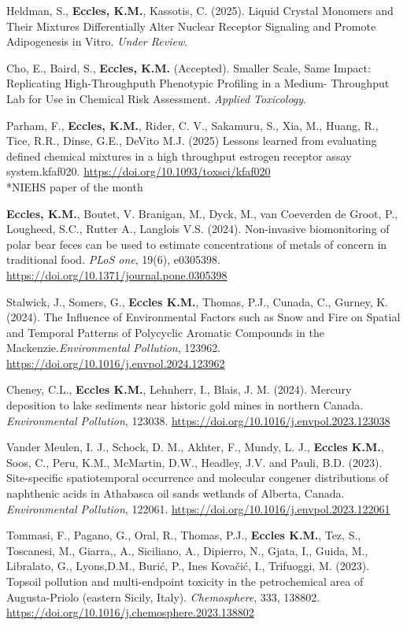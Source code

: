 \documentclass[margin,line]{res}
\begin{document}
\begin{resume}
Heldman, S., \textbf{Eccles, K.M.}, Kassotis, C. (2025). Liquid Crystal Monomers and Their Mixtures Differentially Alter Nuclear Receptor Signaling and Promote Adipogenesis in Vitro. \textit{Under Review}.

Cho, E., Baird, S., \textbf{Eccles, K.M.} (Accepted). Smaller Scale, Same Impact: Replicating High-Throughputh Phenotypic Profiling in a Medium- Throughput Lab for Use in Chemical Risk Assessment. \textit{Applied Toxicology}.

Parham, F., \textbf{Eccles, K.M.}, Rider, C. V., Sakamuru, S., Xia, M., Huang, R., Tice, R.R., Dinse, G.E., DeVito M.J. (2025) Lessons learned from evaluating defined chemical mixtures in a high throughput estrogen receptor assay system.kfaf020. \url{https://doi.org/10.1093/toxsci/kfaf020}\\
\mbox{*}NIEHS paper of the month

\textbf{Eccles, K.M.}, Boutet, V. Branigan, M., Dyck, M., van Coeverden de Groot, P., Lougheed, S.C., Rutter A., Langlois V.S. (2024). Non-invasive biomonitoring of polar bear feces can be used to estimate concentrations of metals of concern in traditional food. \textit{PLoS one}, 19(6), e0305398. \url{https://doi.org/10.1371/journal.pone.0305398}

Stalwick, J., Somers, G., \textbf{Eccles K.M.}, Thomas, P.J., Cunada, C., Gurney, K. (2024). The Influence of Environmental Factors such as Snow and Fire on Spatial and Temporal Patterns of Polycyclic Aromatic Compounds in the Mackenzie.\textit{Environmental Pollution}, 123962. \url{https://doi.org/10.1016/j.envpol.2024.123962}

Cheney, C.L., \textbf{Eccles K.M.}, Lehnherr, I., Blais, J. M. (2024). Mercury deposition to lake sediments near historic gold mines in northern Canada. \textit{Environmental Pollution}, 123038. \url{https://doi.org/10.1016/j.envpol.2023.123038}

Vander Meulen, I. J., Schock, D. M., Akhter, F., Mundy, L. J., \textbf{Eccles K.M.}, Soos, C., Peru, K.M., McMartin, D.W., Headley, J.V. and Pauli, B.D. (2023). Site-specific spatiotemporal occurrence and molecular congener distributions of naphthenic acids in Athabasca oil sands wetlands of Alberta, Canada. \textit{Environmental Pollution}, 122061. \url{https://doi.org/10.1016/j.envpol.2023.122061}

Tommasi, F., Pagano, G., Oral, R., Thomas, P.J., \textbf{Eccles K.M.}, Tez, S., Toscanesi, M., Giarra,, A., Siciliano, A., Dipierro, N., Gjata, I,, Guida, M., Libralato, G., Lyons,D.M., Burić, P., Ines Kovačić, I.,  Trifuoggi, M. (2023). Topsoil pollution and multi-endpoint toxicity in the petrochemical area of Augusta-Priolo (eastern Sicily, Italy). \textit{Chemosphere}, 333, 138802. \url{https://doi.org/10.1016/j.chemosphere.2023.138802}


\end{resume}
\end{document}
